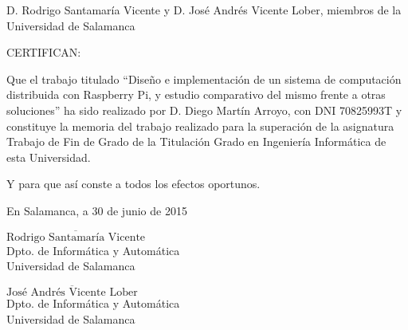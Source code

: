 
D. Rodrigo Santamaría Vicente y D. José Andrés Vicente Lober, miembros de la\\ Universidad de Salamanca

\vspace{20 mm}

CERTIFICAN:

\vspace{20 mm}

Que el trabajo titulado ``Diseño e implementación de un sistema de computación distribuida con
Raspberry Pi, y estudio comparativo del mismo frente a otras soluciones'' ha sido realizado por D. Diego Martín Arroyo, con DNI 70825993T y constituye la memoria del trabajo realizado para la superación de la asignatura Trabajo de Fin de Grado de la Titulación Grado en Ingeniería Informática de esta Universidad.

\vspace{10 mm}

Y para que así conste a todos los efectos oportunos.

\vspace{15 mm}

En Salamanca, a 30 de junio de 2015

\vspace{20 mm}

\begin{minipage}[c][5cm]{.45\textwidth}
$\overline{\mbox{Rodrigo Santamaría Vicente}}$\\
Dpto. de Informática y Automática\\
Universidad de Salamanca
\end{minipage}
\hspace{0.5cm}
\begin{minipage}[c][5cm]{.45\textwidth}
\vspace{17pt}
$\overline{\mbox{José Andrés Vicente Lober}}$\\
Dpto. de Informática y Automática\\
Universidad de Salamanca\\
\end{minipage}
